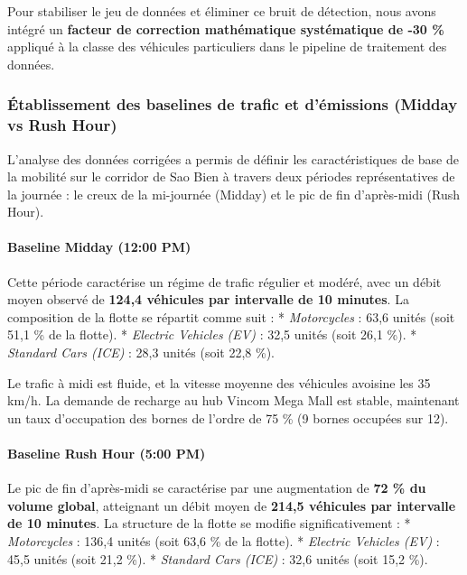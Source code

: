 \documentclass[10pt, a4paper]{article}
\begin{document}
Pour stabiliser le jeu de données et éliminer ce bruit de détection,
nous avons intégré un \textbf{facteur de correction mathématique
systématique de -30 \%} appliqué à la classe des véhicules particuliers
dans le pipeline de traitement des données.

\subsubsection{Établissement des baselines de trafic et d'émissions
(Midday vs Rush
Hour)}\label{uxe9tablissement-des-baselines-de-trafic-et-duxe9missions-midday-vs-rush-hour}

L'analyse des données corrigées a permis de définir les caractéristiques
de base de la mobilité sur le corridor de Sao Bien à travers deux
périodes représentatives de la journée : le creux de la mi-journée
(Midday) et le pic de fin d'après-midi (Rush Hour).

\paragraph{Baseline Midday (12:00 PM)}\label{baseline-midday-1200-pm}

Cette période caractérise un régime de trafic régulier et modéré, avec
un débit moyen observé de \textbf{124,4 véhicules par intervalle de 10
minutes}. La composition de la flotte se répartit comme suit : *
\emph{Motorcycles} : 63,6 unités (soit 51,1 \% de la flotte). *
\emph{Electric Vehicles (EV)} : 32,5 unités (soit 26,1 \%). *
\emph{Standard Cars (ICE)} : 28,3 unités (soit 22,8 \%).

Le trafic à midi est fluide, et la vitesse moyenne des véhicules
avoisine les 35 km/h. La demande de recharge au hub Vincom Mega Mall est
stable, maintenant un taux d'occupation des bornes de l'ordre de 75 \%
(9 bornes occupées sur 12).

\paragraph{Baseline Rush Hour (5:00
PM)}\label{baseline-rush-hour-500-pm}

Le pic de fin d'après-midi se caractérise par une augmentation de
\textbf{72 \% du volume global}, atteignant un débit moyen de
\textbf{214,5 véhicules par intervalle de 10 minutes}. La structure de
la flotte se modifie significativement : * \emph{Motorcycles} : 136,4
unités (soit 63,6 \% de la flotte). * \emph{Electric Vehicles (EV)} :
45,5 unités (soit 21,2 \%). * \emph{Standard Cars (ICE)} : 32,6 unités
(soit 15,2 \%).
\end{document}
